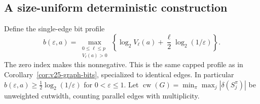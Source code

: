 \subsection{A size-uniform deterministic construction}
Define the single-edge bit profile
\begin{equation}\label{eq:v28-single-bit-profile}
 b(\varepsilon,a)=
       \max_{\substack{0\le\ell\le p\\ V_\ell(a)>0}}
       \left\{\log_2 V_\ell(a)
                        +\frac\ell2\log_2(1/\varepsilon)\right\}.
\end{equation}
The zero index makes this nonnegative. This is the same capped profile
as in Corollary~\ref{cor:v25-graph-bits}, specialized to identical
edges. In particular $b(\varepsilon,a)\ge\tfrac12\log_2(1/\varepsilon)$
for $0<\varepsilon\le1$.
Let $\operatorname{cw}(G)=\min_\pi\max_j|\delta(S_j^\pi)|$ be
unweighted cutwidth, counting parallel edges with multiplicity.

